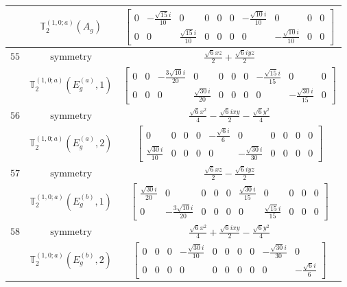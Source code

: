 \documentclass[fleqn,8pt,landscape]{jsarticle}
\begin{document}
\begin{longtable}{ccc}
$  $ & $ \mathbb{T}_{2}^{(1,0;a)}(A_{g}) $ & $ \begin{bmatrix} 0 & - \frac{\sqrt{15} i}{10} & 0 & 0 & 0 & 0 & - \frac{\sqrt{10} i}{10} & 0 & 0 & 0 \\ 0 & 0 & \frac{\sqrt{15} i}{10} & 0 & 0 & 0 & 0 & - \frac{\sqrt{10} i}{10} & 0 & 0 \end{bmatrix} $ \\ \hline
$ 55 $ & $ \text{symmetry} $ & $ \frac{\sqrt{6} x z}{2} + \frac{\sqrt{6} i y z}{2} $ \\
$  $ & $ \mathbb{T}_{2}^{(1,0;a)}(E_{g}^{(a)},1) $ & $ \begin{bmatrix} 0 & 0 & - \frac{3 \sqrt{10} i}{20} & 0 & 0 & 0 & 0 & - \frac{\sqrt{15} i}{15} & 0 & 0 \\ 0 & 0 & 0 & \frac{\sqrt{30} i}{20} & 0 & 0 & 0 & 0 & - \frac{\sqrt{30} i}{15} & 0 \end{bmatrix} $ \\ \hline
$ 56 $ & $ \text{symmetry} $ & $ \frac{\sqrt{6} x^{2}}{4} - \frac{\sqrt{6} i x y}{2} - \frac{\sqrt{6} y^{2}}{4} $ \\
$  $ & $ \mathbb{T}_{2}^{(1,0;a)}(E_{g}^{(a)},2) $ & $ \begin{bmatrix} 0 & 0 & 0 & 0 & - \frac{\sqrt{6} i}{6} & 0 & 0 & 0 & 0 & 0 \\ \frac{\sqrt{30} i}{10} & 0 & 0 & 0 & 0 & - \frac{\sqrt{30} i}{30} & 0 & 0 & 0 & 0 \end{bmatrix} $ \\ \hline
$ 57 $ & $ \text{symmetry} $ & $ \frac{\sqrt{6} x z}{2} - \frac{\sqrt{6} i y z}{2} $ \\
$  $ & $ \mathbb{T}_{2}^{(1,0;a)}(E_{g}^{(b)},1) $ & $ \begin{bmatrix} \frac{\sqrt{30} i}{20} & 0 & 0 & 0 & 0 & \frac{\sqrt{30} i}{15} & 0 & 0 & 0 & 0 \\ 0 & - \frac{3 \sqrt{10} i}{20} & 0 & 0 & 0 & 0 & \frac{\sqrt{15} i}{15} & 0 & 0 & 0 \end{bmatrix} $ \\ \hline
$ 58 $ & $ \text{symmetry} $ & $ \frac{\sqrt{6} x^{2}}{4} + \frac{\sqrt{6} i x y}{2} - \frac{\sqrt{6} y^{2}}{4} $ \\
$  $ & $ \mathbb{T}_{2}^{(1,0;a)}(E_{g}^{(b)},2) $ & $ \begin{bmatrix} 0 & 0 & 0 & - \frac{\sqrt{30} i}{10} & 0 & 0 & 0 & 0 & - \frac{\sqrt{30} i}{30} & 0 \\ 0 & 0 & 0 & 0 & 0 & 0 & 0 & 0 & 0 & - \frac{\sqrt{6} i}{6} \end{bmatrix} $ \\ \hline

\end{longtable}
\end{document}
